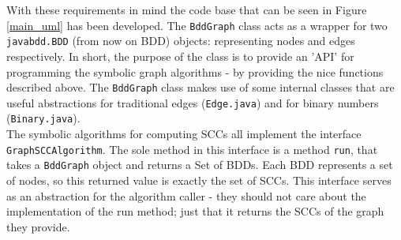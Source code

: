 \documentclass[../master/master.tex]{subfiles}
\begin{document}
With these requirements in mind the code base that can be seen in Figure \ref{main_uml} has been developed. The \texttt{BddGraph} class acts as a wrapper for two \texttt{javabdd.BDD} (from now on BDD) objects: representing nodes and edges respectively. In short, the purpose of the class is to provide an 'API' for programming the symbolic graph algorithms - by providing the nice functions described above. The \texttt{BddGraph} class makes use of some internal classes that are useful abstractions for traditional edges (\texttt{Edge.java}) and for binary numbers (\texttt{Binary.java}).\\

The symbolic algorithms for computing SCCs all implement the interface \texttt{GraphSCCAlgorithm}. The sole method in this interface is a method \texttt{run}, that takes a \texttt{BddGraph} object and returns a Set of BDDs. Each BDD represents a set of nodes, so this returned value is exactly the set of SCCs. This interface serves as an abstraction for the algorithm caller - they should not care about the implementation of the run method; just that it returns the SCCs of the graph they provide.
\end{document}

